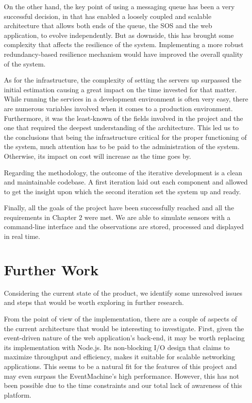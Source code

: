 On the other hand, the key point of using a messaging queue has been a very successful decision, in that has enabled a loosely coupled and scalable architecture that allows both ends of the queue, the SOS and the web application, to evolve independently. But as downside, this has brought some complexity that affects the resilience of the system. Implementing a more robust redundancy-based resilience mechanism would have improved the overall quality of the system.

As for the infrastructure, the complexity of setting the servers up surpassed the initial estimation causing a great impact on the time invested for that matter. While running the services in a development environment is often very easy, there are numerous variables involved when it comes to a production environment. Furthermore, it was the least-known of the fields involved in the project and the one that required the deepest understanding of the architecture. This led us to the conclusions that being the infrastructure critical for the proper functioning of the system, much attention has to be paid to the administration of the system. Otherwise, its impact on cost will increase as the time goes by.

Regarding the methodology, the outcome of the iterative development is a clean and maintainable codebase. A first iteration laid out each component and allowed to get the insight upon which the second iteration set the system up and ready.

Finally, all the goals of the project have been successfully reached and all the requirements in Chapter 2 were met. We are able to simulate sensors with a command-line interface and the observations are stored, processed and displayed in real time.

\section{Further Work}

Considering the current state of the product, we identify some unresolved issues and steps that would be worth exploring in further research.

From the point of view of the implementation, there are a couple of aspects of the current architecture that would be interesting to investigate. First, given the event-driven nature of the web application's  back-end, it may be worth replacing its implementation with Node.js. Its non-blocking I/O design that claims to maximize throughput and efficiency, makes it suitable for scalable networking applications. This seems to be a natural fit for the features of this project and may even surpass the EventMachine's high performance. However, this has not been possible due to the time constraints and our total lack of awareness of this platform.

